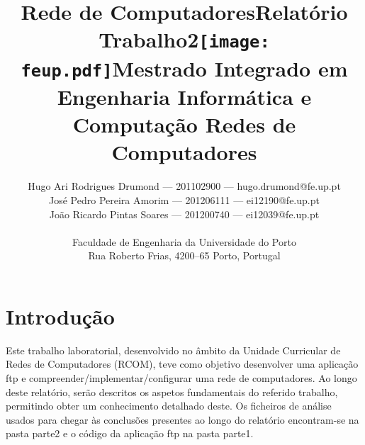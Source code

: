 \documentclass[a4paper]{article}
\begin{document}
\setlength{\textwidth}{16cm} \setlength{\textheight}{22cm}

\title{\Huge\textbf{Rede de Computadores}\linebreak\linebreak\linebreak\linebreak \Large\textbf{Relatório \\
    Trabalho2}\linebreak\linebreak\linebreak\texttt{[image: feup.pdf]}\linebreak \linebreak \Large{Mestrado Integrado em
    Engenharia Informática e Computação} \linebreak \linebreak \Large\textbf{Redes de
Computadores}\linebreak}

\author{Hugo Ari Rodrigues Drumond --- 201102900 --- hugo.drumond@fe.up.pt \\
    José Pedro Pereira Amorim --- 201206111 --- ei12190@fe.up.pt \\ João
    Ricardo Pintas Soares --- 201200740 ---
    ei12039@fe.up.pt\linebreak\linebreak\linebreak \\ \\ Faculdade de
    Engenharia da Universidade do Porto \\ Rua Roberto Frias, 4200--65 Porto,
    Portugal \linebreak\linebreak\linebreak \linebreak\linebreak\vspace{1cm}}
    \maketitle \thispagestyle{empty}

\newpage

\section{Introdução}
Este trabalho laboratorial, desenvolvido no âmbito da Unidade Curricular de
Redes de Computadores (RCOM), teve como objetivo desenvolver uma aplicação ftp
e compreender/implementar/configurar uma rede de computadores. Ao longo deste
relatório, serão descritos os aspetos fundamentais do referido trabalho,
permitindo obter um conhecimento detalhado deste. Os ficheiros de análise
usados para chegar às conclusões presentes ao longo do relatório encontram-se
na pasta parte2 e o código da aplicação ftp na pasta parte1.
\end{document}
